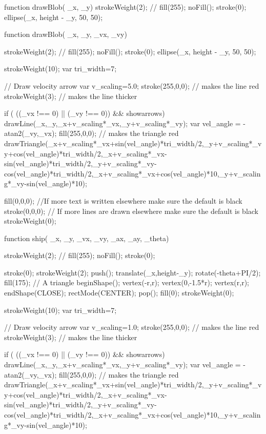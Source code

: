 \documentclass{ximera}
\begin{document}
\begin{javascriptCode}
function drawBlob( _x,  _y){
    strokeWeight(2);
    //    fill(255);
    noFill();
    stroke(0);
    ellipse(_x, height - _y, 50, 50);  
}

function drawBlob( _x,  _y, _vx, _vy){
    strokeWeight(2);
    //    fill(255);
    noFill();
    stroke(0);
    ellipse(_x, height - _y, 50, 50);  
  
            strokeWeight(10);
    var tri_width=7;

    // Draw velocity arrow
    var v_scaling=5.0;
    stroke(255,0,0); // makes the line red
    strokeWeight(3); // makes the line thicker

    if ( ((_vx !== 0) || (_vy !== 0)) && showarrows) {
        drawLine(_x,_y,_x+v_scaling*_vx,_y+v_scaling*_vy);
        var vel_angle = -atan2(_vy,_vx);
        fill(255,0,0); // makes the triangle red
        drawTriangle(_x+v_scaling*_vx+sin(vel_angle)*tri_width/2,_y+v_scaling*_vy+cos(vel_angle)*tri_width/2,_x+v_scaling*_vx-sin(vel_angle)*tri_width/2,_y+v_scaling*_vy-cos(vel_angle)*tri_width/2,_x+v_scaling*_vx+cos(vel_angle)*10,_y+v_scaling*_vy-sin(vel_angle)*10);
    }
  


      fill(0,0,0); //If more text is written elsewhere make sure the default is black
    stroke(0,0,0); // If more lines are drawn elsewhere make sure the default is black
    strokeWeight(0);

}



function ship( _x,  _y, _vx, _vy, _ax, _ay, _theta)
{
    strokeWeight(2);
    //    fill(255);
    noFill();
    stroke(0);

    stroke(0);
    strokeWeight(2);
    push();
    translate(_x,height-_y);
    rotate(-theta+PI/2);
    fill(175);
    // A triangle
    beginShape();
    vertex(-r,r);
    vertex(0,-1.5*r);
    vertex(r,r);
    endShape(CLOSE);
    rectMode(CENTER);
    pop();
    fill(0);
    strokeWeight(0);
  
  
  
    strokeWeight(10);
    var tri_width=7;

    // Draw velocity arrow
    var v_scaling=1.0;
    stroke(255,0,0); // makes the line red
    strokeWeight(3); // makes the line thicker

    if ( ((_vx !== 0) || (_vy !== 0)) && showarrows) {
        drawLine(_x,_y,_x+v_scaling*_vx,_y+v_scaling*_vy);
        var vel_angle = -atan2(_vy,_vx);
        fill(255,0,0); // makes the triangle red
        drawTriangle(_x+v_scaling*_vx+sin(vel_angle)*tri_width/2,_y+v_scaling*_vy+cos(vel_angle)*tri_width/2,_x+v_scaling*_vx-sin(vel_angle)*tri_width/2,_y+v_scaling*_vy-cos(vel_angle)*tri_width/2,_x+v_scaling*_vx+cos(vel_angle)*10,_y+v_scaling*_vy-sin(vel_angle)*10);
    }

}
\end{javascriptCode}
\end{document}

